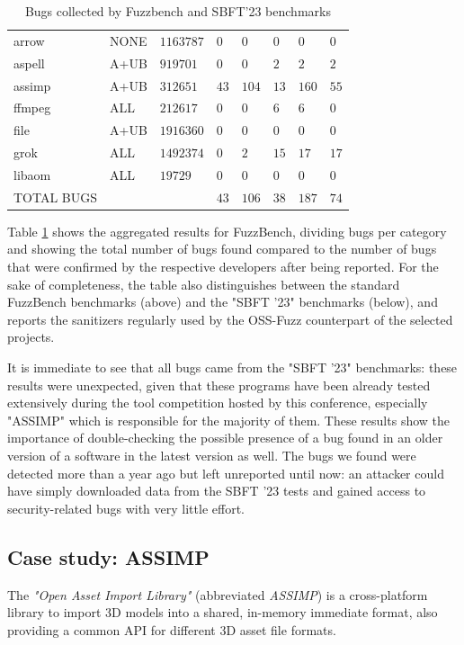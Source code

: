 \begin{table}[h]
{\begin{tabular}{|l|l|l|l|l|l|l|l|}
\hline
arrow   &NONE   &$1163787$   &$0$   &$0$   &$0$   &$0$   &$0$ \\
aspell   &A+UB   &$919701$   &$0$   &$0$   &$2$   &$2$   &$2$ \\
assimp   &A+UB   &$312651$   &$43$   &$104$   &$13$   &$160$   &$55$ \\
ffmpeg   &ALL   &$212617$   &$0$   &$0$   &$6$   &$6$   &$0$ \\
file   &A+UB   &$1916360$   &$0$   &$0$   &$0$   &$0$   &$0$ \\
grok   &ALL   &$1492374$   &$0$   &$2$   &$15$   &$17$   &$17$ \\
libaom   &ALL   &$19729$   &$0$   &$0$   &$0$   &$0$   &$0$ \\
\hline
TOTAL BUGS   &   &   &$43$   &$106$   &$38$   &$187$   &$74$          \\
\hline
\end{tabular}}
\vspace{10pt}
\caption{Bugs collected by Fuzzbench and SBFT'23 benchmarks}
\label{fuzzbench-table}
\end{table}
Table \ref{fuzzbench-table} shows the aggregated results for FuzzBench, dividing bugs per category and showing the total number of bugs found compared to the number of bugs that were confirmed by the respective developers after being reported. For the sake of completeness, the table also distinguishes between the standard FuzzBench benchmarks (above) and the "SBFT '23" benchmarks (below), and reports the sanitizers regularly used by the OSS-Fuzz counterpart of the selected projects.

It is immediate to see that all bugs came from the "SBFT '23" benchmarks: these results were unexpected, given that these programs have been already tested extensively during the tool competition hosted by this conference, especially "ASSIMP" which is responsible for the majority of them. These results show the importance of double-checking the possible presence of a bug found in an older version of a software in the latest version as well. The bugs we found were detected more than a year ago but left unreported until now: an attacker could have simply downloaded data from the SBFT '23 tests and gained access to security-related bugs with very little effort.



\subsection{Case study: ASSIMP}
The \textit{"Open Asset Import Library"} (abbreviated \textit{ASSIMP}) \cite{assimp} is a cross-platform library to import 3D models into a shared, in-memory immediate format, also providing a common API for different 3D asset file formats.


